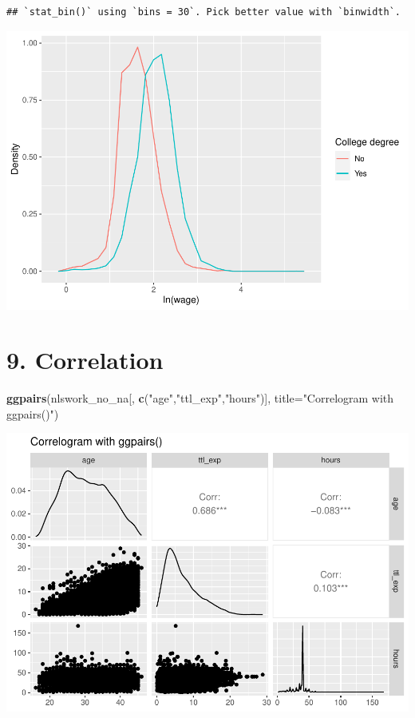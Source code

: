 \documentclass[
]{article}
\newenvironment{Shaded}{\begin{snugshade}}{\end{snugshade}}
\newcommand{\AttributeTok}[1]{\textcolor[rgb]{0.13,0.29,0.53}{#1}}
\newcommand{\FunctionTok}[1]{\textcolor[rgb]{0.13,0.29,0.53}{\textbf{#1}}}
\newcommand{\NormalTok}[1]{#1}
\newcommand{\StringTok}[1]{\textcolor[rgb]{0.31,0.60,0.02}{#1}}
\begin{document}
\begin{verbatim}
## `stat_bin()` using `bins = 30`. Pick better value with `binwidth`.
\end{verbatim}

\includegraphics{RIntro_files/figure-latex/unnamed-chunk-22-1.pdf}

\hypertarget{correlation}{%
\section{9. Correlation}\label{correlation}}

\begin{Shaded}
\begin{Highlighting}[]
\FunctionTok{ggpairs}\NormalTok{(nlswork\_no\_na[, }\FunctionTok{c}\NormalTok{(}\StringTok{"age"}\NormalTok{,}\StringTok{"ttl\_exp"}\NormalTok{,}\StringTok{"hours"}\NormalTok{)], }\AttributeTok{title=}\StringTok{"Correlogram with ggpairs()"}\NormalTok{)}
\end{Highlighting}
\end{Shaded}

\includegraphics{RIntro_files/figure-latex/unnamed-chunk-23-1.pdf}
\end{document}
